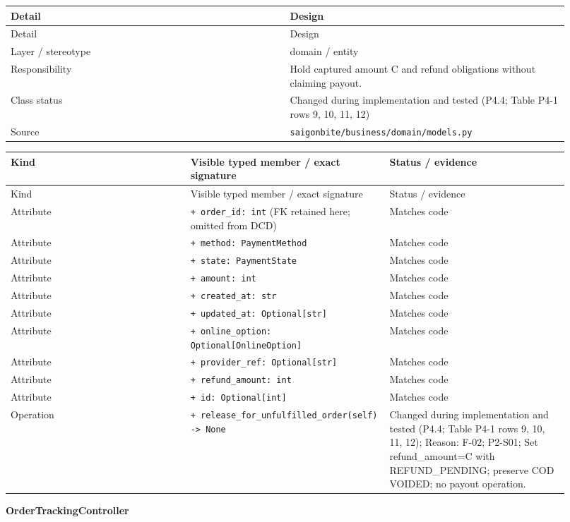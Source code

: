 \begin{longtable}{>{\raggedright\arraybackslash}p{0.4600\linewidth}>{\raggedright\arraybackslash}p{0.4600\linewidth}}
Detail & Design \\
\hline\endfirsthead
Detail & Design \\
\hline\endhead
Layer / stereotype & domain / \guillemotleft{}entity\guillemotright{} \\
Responsibility & Hold captured amount C and refund obligations without claiming payout. \\
Class status & Changed during implementation and tested (P4.4; Table P4-1 rows 9, 10, 11, 12) \\
Source & \texttt{saigonbite/\allowbreak{}business/\allowbreak{}domain/\allowbreak{}models.\allowbreak{}py} \\
\end{longtable}
\begin{longtable}{>{\raggedright\arraybackslash}p{0.3067\linewidth}>{\raggedright\arraybackslash}p{0.3067\linewidth}>{\raggedright\arraybackslash}p{0.3067\linewidth}}
Kind & Visible typed member / exact signature & Status / evidence \\
\hline\endfirsthead
Kind & Visible typed member / exact signature & Status / evidence \\
\hline\endhead
Attribute & \texttt{+ order\_\allowbreak{}id: int} (FK retained here; omitted from DCD) & Matches code \\
Attribute & \texttt{+ method: PaymentMethod} & Matches code \\
Attribute & \texttt{+ state: PaymentState} & Matches code \\
Attribute & \texttt{+ amount: int} & Matches code \\
Attribute & \texttt{+ created\_\allowbreak{}at: str} & Matches code \\
Attribute & \texttt{+ updated\_\allowbreak{}at: Optional[str]} & Matches code \\
Attribute & \texttt{+ online\_\allowbreak{}option: Optional[OnlineOption]} & Matches code \\
Attribute & \texttt{+ provider\_\allowbreak{}ref: Optional[str]} & Matches code \\
Attribute & \texttt{+ refund\_\allowbreak{}amount: int} & Matches code \\
Attribute & \texttt{+ id: Optional[int]} & Matches code \\
Operation & \texttt{+ release\_\allowbreak{}for\_\allowbreak{}unfulfilled\_\allowbreak{}order(self) -\textgreater{} None} & Changed during implementation and tested (P4.4; Table P4-1 rows 9, 10, 11, 12); Reason: F-02; P2-S01; Set refund\_amount=C with REFUND\_PENDING; preserve COD VOIDED; no payout operation. \\
\end{longtable}
\textbf{OrderTrackingController}

